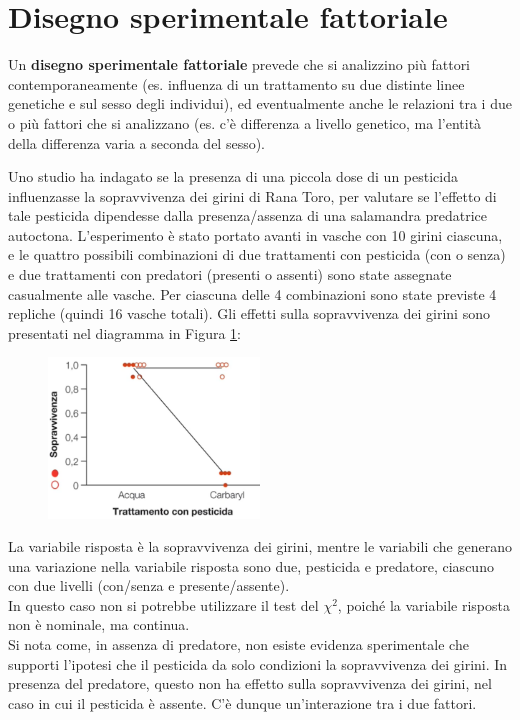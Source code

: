 \documentclass[10pt, draft]{book}
\newcounter{example}[section]
\begin{document}
\section{Disegno sperimentale fattoriale}

Un \textbf{disegno sperimentale fattoriale} prevede che si analizzino più fattori contemporaneamente (es. influenza di un trattamento su due distinte linee genetiche e sul sesso degli individui), ed eventualmente anche le relazioni tra i due o più fattori che si analizzano (es. c'è differenza a livello genetico, ma l'entità della differenza varia a seconda del sesso).
\begin{example}\label{esgirini}
    Uno studio ha indagato se la presenza di una piccola dose di un pesticida influenzasse la sopravvivenza dei girini di Rana Toro, per valutare se l'effetto di tale pesticida dipendesse dalla presenza/assenza di una salamandra predatrice autoctona. L'esperimento è stato portato avanti in vasche con 10 girini ciascuna, e le quattro possibili combinazioni di due trattamenti con pesticida (con o senza) e due trattamenti con predatori (presenti o assenti) sono state assegnate casualmente alle vasche. Per ciascuna delle 4 combinazioni sono state previste 4 repliche (quindi 16 vasche totali). Gli effetti sulla sopravvivenza dei girini sono presentati nel diagramma in Figura \ref{fig14.5-1}:\\
    \begin{figure}[H]
        \centering
        \includegraphics[width=0.5\textwidth]{fig14.5-1}
        \caption{\small{}}
        \label{fig14.5-1}
    \end{figure}

    La variabile risposta è la sopravvivenza dei girini, mentre le variabili che generano una variazione nella variabile risposta sono due, pesticida e predatore, ciascuno con due livelli (con/senza e presente/assente).\\
    In questo caso non si potrebbe utilizzare il test del $\chi^2$, poiché la variabile risposta non è nominale, ma continua.\\
    Si nota come, in assenza di predatore, non esiste evidenza sperimentale che supporti l'ipotesi che il pesticida da solo condizioni la sopravvivenza dei girini. In presenza del predatore, questo non ha effetto sulla sopravvivenza dei girini, nel caso in cui il pesticida è assente. C'è dunque un'interazione tra i due fattori.
\end{example}
\end{document}

